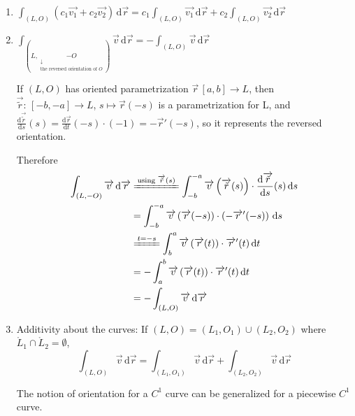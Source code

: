 \begin{enumerate}
    \item $\int_{(L,O)}\left(c_1\overrightarrow{v_1}+c_2\overrightarrow{v_2}\right)\,\mathrm{d}\overrightarrow{r}=c_1\int_{(L,O)}\overrightarrow{v_1}\,\mathrm{d}\overrightarrow{r}+c_2\int_{(L,O)}\overrightarrow{v_2}\,\mathrm{d}\overrightarrow{r}$
    \item $\int_{(L,\underset{\substack{\downarrow\\\text{the reversed orientation of }O}}{-O})}\overrightarrow{v}\,\mathrm{d}\overrightarrow{r}=-\int_{(L,O)}\overrightarrow{v}\,\mathrm{d}\overrightarrow{r}$

          If $(L,O)$ has oriented parametrization $\overrightarrow{r}\,[a,b]\to L$, then $\overrightarrow{\tilde{r}}:\,[-b,-a]\to L$, $s\mapsto\overrightarrow{r}(-s)$ is a parametrization for L, and $\frac{\mathrm{d}\overrightarrow{\tilde{r}}}{\mathrm{d}s}(s)=\frac{\mathrm{d}\overrightarrow{r}}{\mathrm{d}t}(-s)\cdot(-1)=-\overrightarrow{r}'(-s)$, so it represents the reversed orientation.

          Therefore
          \begin{align*}
              \int_{(L,-O)}\overrightarrow{v}\,\mathrm{d}\overrightarrow{r}
               & \xlongequal{\text{using }\overrightarrow{\tilde{r}}(s)}\int_{-b}^{-a}\overrightarrow{v}\left(\overrightarrow{\tilde{r}}(s)\right)\cdot\frac{\mathrm{d}\overrightarrow{\tilde{r}}}{\mathrm{d}s}(s)\,\mathrm{d}s \\
               & =\int_{-b}^{-a}\overrightarrow{v}\left(\overrightarrow{r}(-s)\right)\cdot\left(-\overrightarrow{r}'(-s)\right)\,\mathrm{d}s                                                                                    \\
               & \xlongequal{t=-s}\int_b^a\overrightarrow{v}\left(\overrightarrow{r}(t)\right)\cdot\overrightarrow{r}'(t)\,\mathrm{d}t                                                                                          \\
               & =-\int_a^b\overrightarrow{v}\left(\overrightarrow{r}(t)\right)\cdot\overrightarrow{r}'(t)\,\mathrm{d}t                                                                                                         \\
               & =-\int_{(L,O)}\overrightarrow{v}\,\mathrm{d}\overrightarrow{r}
          \end{align*}

    \item Additivity about the curves: If $(L,O)=(L_1,O_1)\cup(L_2,O_2)$ where $\mathring{L}_1\cap\mathring{L}_2=\emptyset$,
          $$\int_{(L,O)}\overrightarrow{v}\,\mathrm{d}\overrightarrow{r}=\int_{(L_1,O_1)}\overrightarrow{v}\,\mathrm{d}\overrightarrow{r}+\int_{(L_2,O_2)}\overrightarrow{v}\,\mathrm{d}\overrightarrow{r}$$

          The notion of orientation for a $C^1$ curve can be generalized for a piecewise $C^1$ curve.
\end{enumerate}

